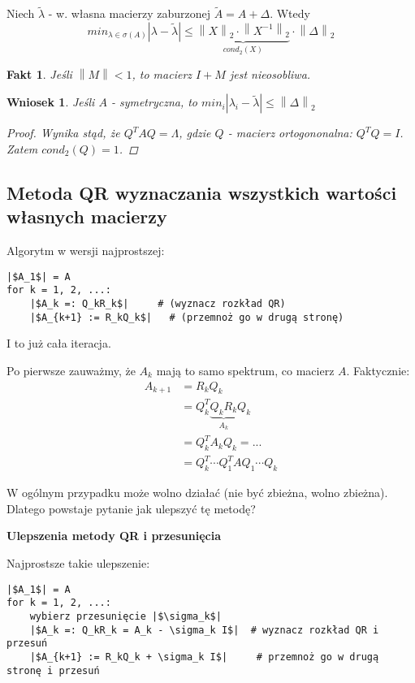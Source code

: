 \documentclass[hidelinks,a4paper,fleqn,oneside]{book}
\newcommand{\norm}[1]{\left\lVert#1\right\rVert}
\newtheorem{wniosek}{Wniosek}
\newtheorem{fakt}{Fakt}
\begin{document}
Niech $\tilde{\lambda}$ - w. własna macierzy zaburzonej $\tilde{A} = A + \Delta$. Wtedy
\[
	min_{\lambda \in \sigma(A)} |\lambda - \tilde{\lambda}| \leq \underbrace{\norm{X} _2 \cdot \norm{X^{-1}}_2}_{cond_2(X)} \cdot \norm{\Delta}_2
\]

\begin{fakt}Jeśli $\norm{M} < 1$, to macierz $I+M$ jest nieosobliwa.
\end{fakt}

\begin{wniosek}
	Jeśli $A$ - symetryczna, to $min_i |\lambda_i - \tilde{\lambda}| \leq \norm{\Delta}_2$
	
	\begin{proof} Wynika stąd, że $Q^TAQ = \Lambda$, gdzie $Q$ - macierz ortogononalna: $Q^TQ = I$. Zatem $cond_2(Q) = 1$.\end{proof}
\end{wniosek}

\subsection{Metoda QR wyznaczania wszystkich wartości własnych macierzy}
Algorytm w wersji najprostszej:
\begin{verbatim}
|$A_1$| = A
for k = 1, 2, ...:
    |$A_k =: Q_kR_k$|     # (wyznacz rozkład QR)
    |$A_{k+1} := R_kQ_k$|   # (przemnoż go w drugą stronę)
\end{verbatim}
I to już cała iteracja.

Po pierwsze zauważmy, że $A_k$ mają to samo spektrum, co macierz $A$. Faktycznie: 
\begin{equation}
	\begin{aligned}
		A_{k+1} & = R_kQ_k                            \\
		        & = Q_k^T\underbrace{Q_kR_k}_{A_k}Q_k \\
		        & = Q_k^TA_kQ_k = ...                 \\
		        & = Q_k^T\cdots Q_1^TA Q_1 \cdots Q_k 
	\end{aligned}
\end{equation}

W ogólnym przypadku może wolno działać (nie być zbieżna, wolno zbieżna). Dlatego powstaje pytanie jak ulepszyć tę metodę? 

\textbf{Ulepszenia metody QR i przesunięcia}

Najprostsze takie ulepszenie:
\begin{verbatim}
|$A_1$| = A
for k = 1, 2, ...:
    wybierz przesunięcie |$\sigma_k$|
    |$A_k =: Q_kR_k = A_k - \sigma_k I$|  # wyznacz rozkład QR i przesuń
    |$A_{k+1} := R_kQ_k + \sigma_k I$|     # przemnoż go w drugą stronę i przesuń
\end{verbatim}
\end{document}
